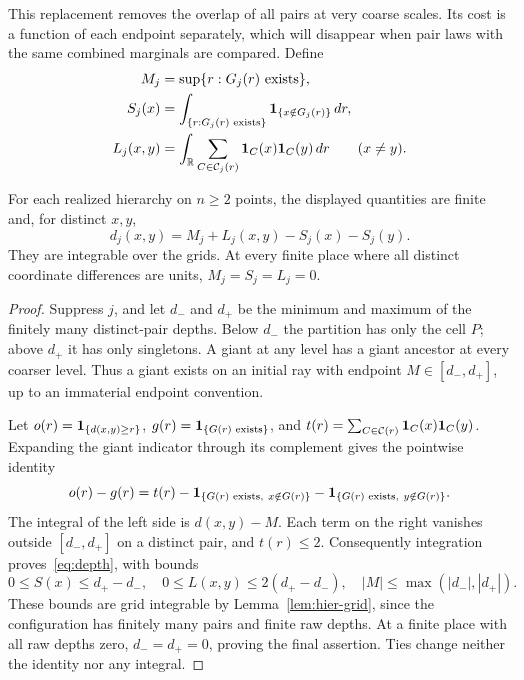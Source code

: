 This replacement removes the overlap of all pairs at very coarse
scales.  Its cost is a function of each endpoint separately, which
will disappear when pair laws with the same combined marginals are
compared.  Define
\begin{align*}
 M_j&=\sup\{r:G_j(r)\text{ exists}\},\\
 S_j(x)&=\int_{\{r:G_j(r)\text{ exists}\}}
              \mathbf 1_{\{x\notin G_j(r)\}}\,dr,\\
 L_j(x,y)&=\int_\mathbb R\sum_{C\in\mathcal C_j(r)}
                    \mathbf 1_C(x)\mathbf 1_C(y)\,dr\qquad(x\ne y).
\end{align*}

\begin{lemma}\label{lem:hier-depth}
For each realized hierarchy on $n\ge2$ points, the displayed
quantities are finite and, for distinct $x,y$,
\begin{equation}\label{eq:depth}
 d_j(x,y)=M_j+L_j(x,y)-S_j(x)-S_j(y).
\end{equation}
They are integrable over the grids.  At every finite place where all
distinct coordinate differences are units, $M_j=S_j=L_j=0$.
\end{lemma}

\begin{proof}
Suppress $j$, and let $d_-$ and $d_+$ be the minimum and maximum of
the finitely many distinct-pair depths.  Below $d_-$ the partition
has only the cell $P$; above $d_+$ it has only singletons.  A giant
at any level has a giant ancestor at every coarser level.  Thus a
giant exists on an initial ray with endpoint $M\in[d_-,d_+]$,
up to an immaterial endpoint convention.

Let $o(r)=\mathbf 1_{\{d(x,y)\ge r\}}$, $g(r)=\mathbf 1_{\{G(r)\text{ exists}\}}$,
and $t(r)=\sum_{C\in\mathcal C(r)}\mathbf 1_C(x)\mathbf 1_C(y)$.  Expanding the
giant indicator through its complement gives the pointwise identity
\[
 o(r)-g(r)=t(r)
       -\mathbf 1_{\{G(r)\text{ exists},\ x\notin G(r)\}}
       -\mathbf 1_{\{G(r)\text{ exists},\ y\notin G(r)\}}.
\]
The integral of the left side is $d(x,y)-M$.  Each term on the
right vanishes outside $[d_-,d_+]$ on a distinct pair, and $t(r)\le2$.
Consequently integration proves~\eqref{eq:depth}, with bounds
\[
 0\le S(x)\le d_+-d_-,\quad
 0\le L(x,y)\le2(d_+-d_-),\quad
 |M|\le\max(|d_-|,|d_+|).
\]
These bounds are grid integrable by Lemma~\ref{lem:hier-grid}, since
the configuration has finitely many pairs and finite raw depths.
At a finite place with all raw depths zero, $d_-=d_+=0$, proving the final
assertion.  Ties change neither the identity nor any integral.
\end{proof}

